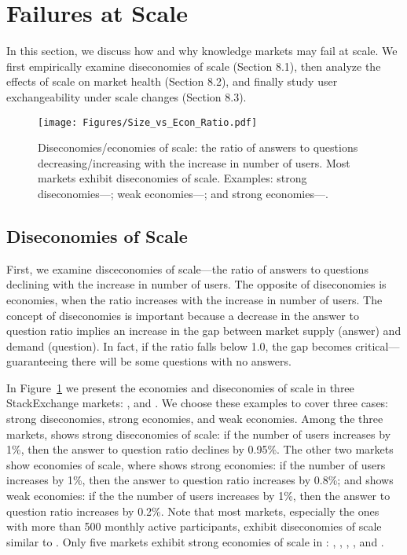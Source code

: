 \section{Failures at Scale}
In this section, we discuss how and why knowledge markets may fail at scale. We first empirically examine diseconomies of scale (Section 8.1), then analyze the effects of scale on market health (Section 8.2), and finally study user exchangeability under scale changes (Section 8.3).

\begin{figure}[b]
\centering
\texttt{[image: Figures/Size\_vs\_Econ\_Ratio.pdf]}
\caption{Diseconomies/economies of scale: the ratio of answers to questions decreasing/increasing with the increase in number of users. Most  markets exhibit diseconomies of scale. Examples: strong diseconomies---; weak economies---; and strong economies---.}
\label{fig:diseconomy}
\end{figure}

\subsection{Diseconomies of Scale}
First, we examine disceconomies of scale---the ratio of answers to questions declining with the increase in number of users. The opposite of diseconomies is economies, when the ratio increases with the increase in number of users. The concept of diseconomies is important because a decrease in the answer to question ratio implies an increase in the gap between market supply (answer) and demand (question). In fact, if the ratio falls below 1.0, the gap becomes critical---guaranteeing there will be some questions with no answers. 

In Figure~\ref{fig:diseconomy} we present the economies and diseconomies of scale in three StackExchange markets: ,  and . We choose these examples to cover three cases: strong diseconomies, strong economies, and weak economies. Among the three markets,  shows strong diseconomies of scale: if the number of users increases by 1\%, then the answer to question ratio declines by 0.95\%. The other two markets show economies of scale, where  shows strong economies: if the number of users increases by 1\%, then the answer to question ratio increases by 0.8\%; and  shows weak economies: if the the number of users increases by 1\%, then the answer to question ratio increases by 0.2\%. Note that most markets, especially the ones with more than 500 monthly active participants, exhibit diseconomies of scale similar to . Only five markets exhibit strong economies of scale in : , , , , and .

